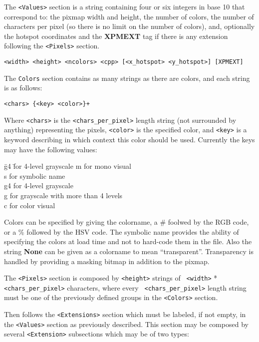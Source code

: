 The {\tt <Values>} section is a string containing four or six integers in base
10 that correspond to: the pixmap width and height, the number of colors, the
number of characters per pixel (so there is no limit on the number of colors),
and, optionally the hotspot coordinates and the {\bf XPMEXT} tag if there is
any extension following the {\tt <Pixels>} section.

{\tt <width> <height> <ncolors> <cpp> [<x\_hotspot> <y\_hotspot>] [XPMEXT]}

The {\tt Colors} section contains as many strings as there are colors, and
each string is as follows:

{\tt <chars> \{<key> <color>\}+}

Where {\tt <chars>} is the {\tt <chars\_per\_pixel>} length string (not
surrounded by anything) representing the pixels, {\tt <color>} is the
specified color, and {\tt <key>} is a keyword describing in which context this
color should be used. Currently the keys may have the following values:

\begin{tabbing}
\hspace{1cm}\= g4 \= for 4-level grayscale\kill
\> m  \>for mono visual\\
\> s  \> for symbolic name\\
\> g4 \> for 4-level grayscale\\
\> g  \> for grayscale with more than 4 levels\\
\> c  \> for color visual
\end{tabbing}

Colors can be specified by giving the colorname, a \# foolwed by the RGB code,
or a \% followed by the HSV code. The symbolic name provides the ability of
specifying the colors at load time and not to hard-code them in the file.
Also the string {\bf None} can be given as a colorname to mean
``transparent''. Transparency is handled by providing a masking bitmap in
addition to the pixmap.

The {\tt <Pixels>} section is composed by {\tt <height>} strings of {\tt
<width>} * {\tt <chars\_per\_pixel>} characters, where every {\tt
<chars\_per\_pixel>} length string must be one of the previously defined
groups in the {\tt <Colors>} section.

Then follows the {\tt <Extensions>} section which must be labeled, if not
empty, in the {\tt <Values>} section as previously described.
This section may be composed by several {\tt <Extension>} subsections which
may be of two types:

